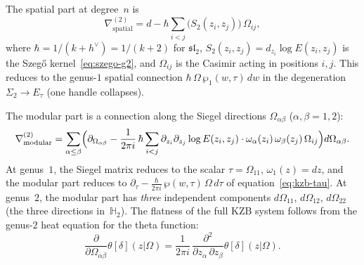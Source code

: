 \documentclass[11pt,reqno]{amsart}
\theoremstyle{definition}
\theoremstyle{remark}
\newcommand{\HHH}{\mathbb{H}}
\numberwithin{equation}{section}
\begin{document}
The spatial part at degree~$n$ is
\begin{equation}\label{eq:kzb-g2-spatial}
  \nabla^{(2)}_{\mathrm{spatial}}
  = d
  - \hbar \sum_{i < j}
  \bigl(S_2(z_i, z_j)\bigr)\,\Omega_{ij},
\end{equation}
where $\hbar = 1/(k + h^\vee) = 1/(k+2)$ for
$\mathfrak{sl}_2$, $S_2(z_i, z_j) = d_{z_i}\log E(z_i, z_j)$
is the Szeg\H{o} kernel~\eqref{eq:szego-g2},
and $\Omega_{ij}$ is the Casimir acting in positions
$i, j$. This reduces to the genus-$1$ spatial connection
$\hbar\,\Omega\,\wp_1(w, \tau)\,dw$ in the degeneration
$\Sigma_2 \to E_\tau$ (one handle collapses).

The modular part is a connection along the Siegel
directions $\Omega_{\alpha\beta}$ ($\alpha, \beta = 1, 2$):
\begin{equation}\label{eq:kzb-g2-modular}
  \nabla^{(2)}_{\mathrm{modular}}
  = \sum_{\alpha \leq \beta}
  \Bigl(
  \partial_{\Omega_{\alpha\beta}}
  - \frac{1}{2\pi i}\,\hbar
  \sum_{i < j}
  \partial_{z_i}\partial_{z_j}
  \log E(z_i, z_j) \cdot
  \omega_\alpha(z_i)\,\omega_\beta(z_j)\,
  \Omega_{ij}
  \Bigr)
  d\Omega_{\alpha\beta}.
\end{equation}
At genus~$1$, the Siegel matrix reduces to the scalar
$\tau = \Omega_{11}$, $\omega_1(z) = dz$, and the modular
part reduces to
$\partial_\tau - \frac{\hbar}{2\pi i}\,
\wp(w, \tau)\,\Omega\,d\tau$
of equation~\eqref{eq:kzb-tau}. At genus~$2$, the modular
part has \emph{three} independent components
$d\Omega_{11}$, $d\Omega_{12}$, $d\Omega_{22}$ (the three
directions in~$\HHH_2$). The flatness of the full KZB
system follows from the genus-$2$ heat equation for the
theta function:
\begin{equation}\label{eq:heat-g2}
  \frac{\partial}{\partial \Omega_{\alpha\beta}}
  \theta[\delta](z|\Omega)
  = \frac{1}{2\pi i}\,
  \frac{\partial^2}{\partial z_\alpha\,\partial z_\beta}
  \theta[\delta](z|\Omega).
\end{equation}
\end{document}
